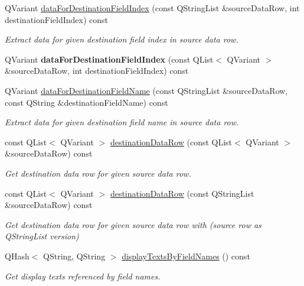 \begin{DoxyCompactItemize}
QVariant \hyperlink{classmdt_field_map_a732aba70514367a36d849146bb9024f9}{dataForDestinationFieldIndex} (const QStringList \&sourceDataRow, int destinationFieldIndex) const 
\begin{DoxyCompactList}\small\item\em Extract data for given destination field index in source data row. \end{DoxyCompactList}\item 
\hypertarget{classmdt_field_map_a4e33322d4f442e25c425cf3d484e6df7}{
QVariant {\bfseries dataForDestinationFieldIndex} (const QList$<$ QVariant $>$ \&sourceDataRow, int destinationFieldIndex) const }
\label{classmdt_field_map_a4e33322d4f442e25c425cf3d484e6df7}

\item 
QVariant \hyperlink{classmdt_field_map_a37e51cb2b3d32a742f9fff51021d0a5c}{dataForDestinationFieldName} (const QStringList \&sourceDataRow, const QString \&destinationFieldName) const 
\begin{DoxyCompactList}\small\item\em Extract data for given destination field name in source data row. \end{DoxyCompactList}\item 
\hypertarget{classmdt_field_map_aef41b8ebbc6a84b4d98563d6004bd2af}{
const QList$<$ QVariant $>$ \hyperlink{classmdt_field_map_aef41b8ebbc6a84b4d98563d6004bd2af}{destinationDataRow} (const QList$<$ QVariant $>$ \&sourceDataRow) const }
\label{classmdt_field_map_aef41b8ebbc6a84b4d98563d6004bd2af}

\begin{DoxyCompactList}\small\item\em Get destination data row for given source data row. \end{DoxyCompactList}\item 
\hypertarget{classmdt_field_map_ae10f3fd5e5c38fe00e57c54edbe5600e}{
const QList$<$ QVariant $>$ \hyperlink{classmdt_field_map_ae10f3fd5e5c38fe00e57c54edbe5600e}{destinationDataRow} (const QStringList \&sourceDataRow) const }
\label{classmdt_field_map_ae10f3fd5e5c38fe00e57c54edbe5600e}

\begin{DoxyCompactList}\small\item\em Get destination data row for given source data row with (source row as QStringList version) \end{DoxyCompactList}\item 
QHash$<$ QString, QString $>$ \hyperlink{classmdt_field_map_ad772f68130bd2e535f598b1d091a7b53}{displayTextsByFieldNames} () const 
\begin{DoxyCompactList}\small\item\em Get display texts referenced by field names. \end{DoxyCompactList}\end{DoxyCompactItemize}


